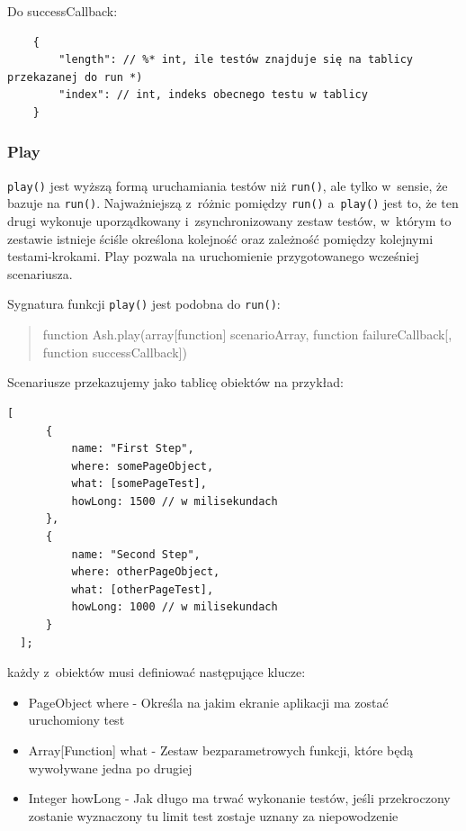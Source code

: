 \documentclass[brudnopis]{xmgr}
\begin{document}
Do successCallback: 

\begin{lstlisting}
	{
		"length": // %* int, ile testów znajduje się na tablicy przekazanej do run *) 
		"index": // int, indeks obecnego testu w tablicy 
	}
\end{lstlisting}

\subsubsection{Play} 

\texttt{play()} jest wyższą formą uruchamiania testów niż \texttt{run()}, ale tylko w~sensie, że bazuje na \texttt{run()}. Najważniejszą z~różnic pomiędzy \texttt{run()} a~\texttt{play()} jest to, że ten drugi wykonuje uporządkowany i~zsynchronizowany zestaw testów, w~którym to zestawie istnieje ściśle określona kolejność oraz zależność pomiędzy kolejnymi testami-krokami. Play pozwala na uruchomienie przygotowanego wcześniej scenariusza. 

Sygnatura funkcji \texttt{play()} jest podobna do \texttt{run()}:

\begin{quote}
function Ash.play(array[function] scenarioArray, function failureCallback[, function successCallback]) 
\end{quote}

Scenariusze przekazujemy jako tablicę obiektów na przykład:

\begin{lstlisting}
[
      {
          name: "First Step",
          where: somePageObject,
          what: [somePageTest],
          howLong: 1500	// w milisekundach
      },
      {
          name: "Second Step",
          where: otherPageObject,
          what: [otherPageTest],
          howLong: 1000	// w milisekundach
      }
  ];
\end{lstlisting}

każdy z~obiektów musi definiować następujące klucze:

\begin{itemize}
  \item PageObject where - Określa na jakim ekranie aplikacji ma zostać uruchomiony test
  \item Array[Function] what - Zestaw bezparametrowych funkcji, które będą wywoływane jedna po drugiej 
  \item Integer howLong - Jak długo ma trwać wykonanie testów, jeśli przekroczony zostanie wyznaczony tu limit test zostaje uznany za niepowodzenie 
\end{itemize}
\end{document}
